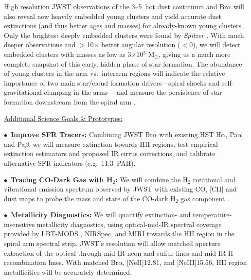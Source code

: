 \documentclass[12pt]{article}
\newenvironment{parhang}{\hangafter=1\hangindent=10pt}{\par}
\begin{document}
High resolution JWST observations of the 3--5\micron\ hot dust continuum and Br$\alpha$ will also reveal new heavily embedded young clusters and yield accurate dust extinctions (and thus better ages and masses) for already-known young clusters. Only the brightest deeply embedded clusters were found by {\em Spitzer} \citep[][]{elmegreen2014}. With much deeper observations and $>$10$\times$ better angular resolution ($<$0), we will detect embedded clusters with masses as low as 3$\times$10$^3$ M$_{\odot}$, giving us a much more complete snapshot of this early, hidden phase of star formation. The abundance of young clusters in the arm vs.\ interarm regions will indicate the relative importance of two main star/cloud formation drivers---spiral shocks and self-gravitational clumping in the arms \citep{kim2002}---and measure the persistence of star formation downstream from the spiral arm \citep{koda2009}. 

\vspace{0.05in}

\noindent \underline{Additional Science Goals \& Prototypes:}

    \begin{parhang}
    \noindent
    $\bullet$~{\bf Improve SFR Tracers:} Combining JWST Br$\alpha$ with existing HST H$\alpha$, Pa$\alpha$, and Pa$\beta$, we will measure extinction towards H{\small II} regions, test empirical extinction estimators and proposed IR cirrus corrections, and calibrate alternative SFR indicators (e.g.\ 11.3\micron\ PAH).%
    \end{parhang}
    \begin{parhang}
    \noindent
    $\bullet$~{\bf Tracing CO-Dark Gas with H$_{2}$:} We will combine the H$_2$ rotational and vibrational emission spectrum observed by JWST with existing CO, [C{\small II}] and dust maps to probe the mass and state of the CO-dark H$_2$ gas component \citep[e.g.,][]{togi2016}.
    \end{parhang}
        
    \begin{parhang}
    \noindent
    $\bullet$~{\bf Metallicity Diagnostics:} We will quantify extinction- and temperature-insensitive metallicity diagnostics, using optical-mid-IR spectral coverage provided by LBT-MODS \citep{croxall2015}, NIRSpec, and MIRI towards the H{\small II} region in the spiral arm spectral strip. JWST's resolution will allow matched aperture extraction of the optical through mid-IR neon and sulfur lines and mid-IR H recombination lines. With matched Br$\alpha$, [Ne{\small II}]12.81\micron, and [Ne{\small III}]15.56\micron, H{\small II} region metallicities will be accurately determined.
    \end{parhang}
\end{document}
